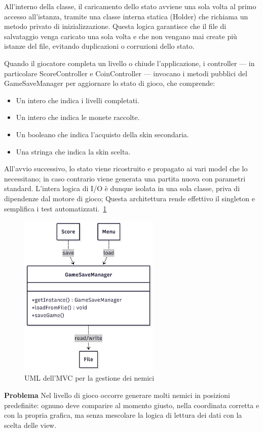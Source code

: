 \documentclass[a4paper,12pt]{report}
\begin{document}
All'interno della classe, il caricamento dello stato avviene una sola volta al primo accesso all'istanza, tramite una classe interna statica (Holder) che 
richiama un metodo privato di inizializzazione. Questa logica garantisce che il file di salvataggio venga caricato una sola volta e 
che non vengano mai create più istanze del file, evitando duplicazioni o corruzioni dello stato.

Quando il giocatore completa un livello o chiude l’applicazione, i controller — in particolare ScoreController e CoinController — invocano i metodi pubblici del GameSaveManager 
per aggiornare lo stato di gioco, che comprende:
\begin{itemize}
    \item Un intero che indica i livelli completati.
    \item Un intero che indica le monete raccolte.
    \item Un booleano che indica l'acquisto della skin secondaria.
    \item Una stringa che indica la skin scelta.
\end{itemize}
All'avvio successivo, lo stato viene ricostruito e propagato ai vari model che lo necessitano; in caso contrario viene generata una partita nuova con parametri standard. 
L'intera logica di I/O è dunque isolata in una sola classe, priva di dipendenze dal motore di gioco; Questa architettura rende effettivo
il singleton e semplifica i test automatizzati.~\ref{fig:2.10}
\begin{figure}
    \centering
    \includegraphics[width=0.6\textwidth]{resources/saveManagerUML.png}
    \caption{UML dell'MVC per la gestione dei nemici}
    \label{fig:2.10}
\end{figure}
\newpage
\textbf{Problema} Nel livello di gioco occorre generare molti nemici in posizioni predefinite: ognuno deve comparire al momento giusto,
nella coordinata corretta e con la propria grafica, ma senza mescolare la logica di lettura dei dati con la scelta delle view. 
\end{document}

